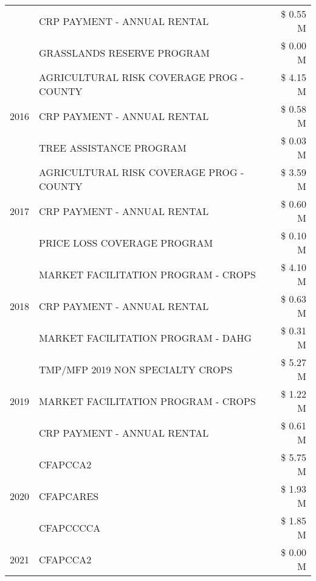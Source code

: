 \begin{tabular}{llr}
 & CRP PAYMENT - ANNUAL RENTAL & \$ 0.55 M \\
 & GRASSLANDS RESERVE PROGRAM & \$ 0.00 M \\
\cline{1-3}
\multirow[t]{3}{*}{2016} & AGRICULTURAL RISK COVERAGE PROG - COUNTY      & \$ 4.15 M \\
 & CRP PAYMENT - ANNUAL RENTAL                   & \$ 0.58 M \\
 & TREE ASSISTANCE PROGRAM                       & \$ 0.03 M \\
\cline{1-3}
\multirow[t]{3}{*}{2017} & AGRICULTURAL RISK COVERAGE PROG - COUNTY & \$ 3.59 M \\
 & CRP PAYMENT - ANNUAL RENTAL & \$ 0.60 M \\
 & PRICE LOSS COVERAGE PROGRAM & \$ 0.10 M \\
\cline{1-3}
\multirow[t]{3}{*}{2018} & MARKET FACILITATION PROGRAM - CROPS & \$ 4.10 M \\
 & CRP PAYMENT - ANNUAL RENTAL & \$ 0.63 M \\
 & MARKET FACILITATION PROGRAM - DAHG & \$ 0.31 M \\
\cline{1-3}
\multirow[t]{3}{*}{2019} & TMP/MFP 2019 NON SPECIALTY CROPS & \$ 5.27 M \\
 & MARKET FACILITATION PROGRAM - CROPS & \$ 1.22 M \\
 & CRP PAYMENT - ANNUAL RENTAL & \$ 0.61 M \\
\cline{1-3}
\multirow[t]{3}{*}{2020} & CFAPCCA2 & \$ 5.75 M \\
 & CFAPCARES & \$ 1.93 M \\
 & CFAPCCCCA & \$ 1.85 M \\
\cline{1-3}
2021 & CFAPCCA2 & \$ 0.00 M \\
\cline{1-3}
\bottomrule
\end{tabular}
